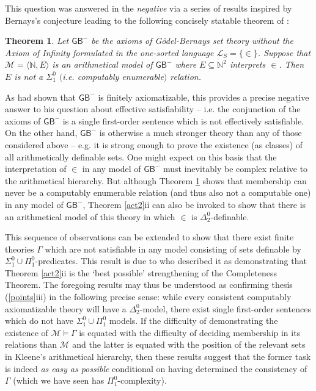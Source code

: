 \documentclass[11pt,fleqn,leqno]{article}
\newtheorem{theorem}{Theorem}[section]
\begin{document}
This question was answered in the \textsl{negative} via a series of results inspired by Bernays's conjecture leading to the following concisely statable theorem of \citet{Rabin1958}:
\begin{theorem} \label{rabin} Let $\mathsf{GB}^-$ be the axioms of G\"odel-Bernays set theory without the Axiom of Infinity formulated in the one-sorted language $\mathcal{L}_{S} = \{\in\}$.  Suppose that $\mathcal{M} = \langle \mathbb{N},E \rangle$ is an arithmetical model of $\mathsf{GB}^-$ where $E \subseteq \mathbb{N}^2$ interprets $\in$.  Then $E$ is not a $\Sigma^0_1$ $($i.e. computably enumerable$)$ relation.
\end{theorem}
\noindent  As \citet{Bernays1937} had shown that $\mathsf{GB}^-$ is finitely axiomatizable, this provides a precise negative answer to his question about effective satisfiability -- i.e. the conjunction of the axioms of $\mathsf{GB}^-$ is a single first-order sentence which is not effectively satisfiable.   On the other hand, $\mathsf{GB}^-$ is otherwise a much stronger theory than any of those considered above -- e.g. it is strong enough to prove the existence (as classes) of all arithmetically definable sets.   One might expect on this basis that the interpretation of $\in$ in any model of $\mathsf{GB}^-$ must inevitably be complex relative to the arithmetical hierarchy.   But although Theorem \ref{rabin} shows that membership can never be a computably enumerable relation (and thus also not a computable one) in any model of $\mathsf{GB}^-$, Theorem \ref{act2}ii can also be invoked to show that there is an arithmetical model of this theory in which $\in$ is $\Delta^0_2$-definable.   

This sequence of observations can be extended to show that there exist finite theories $\Gamma$  which are not satisfiable in any model consisting of sets definable by $\Sigma^0_1 \cup \Pi^0_1$-predicates. This result is due to \citet{Putnam1957} who described it as demonstrating that Theorem \ref{act2}ii is the `best possible' strengthening of the Completeness Theorem.    The foregoing results may thus be understood as confirming thesis (\ref{points}iii) in the following precise sense: while every consistent computably axiomatizable theory will have a $\Delta^0_2$-model, there exist single first-order sentences which do not have $\Sigma^0_1 \cup \Pi^0_1$ models.     If the difficulty of demonstrating the existence of $\mathcal{M} \models \Gamma$ is equated with the difficulty of deciding membership in its relations than $\mathcal{M}$ and the latter is equated with the position of the relevant sets in Kleene's arithmetical hierarchy,  then these results suggest that the former task is indeed \textsl{as easy as possible} conditional on having determined the consistency of $\Gamma$ (which we have seen has $\Pi^0_1$-complexity).    
\end{document}
